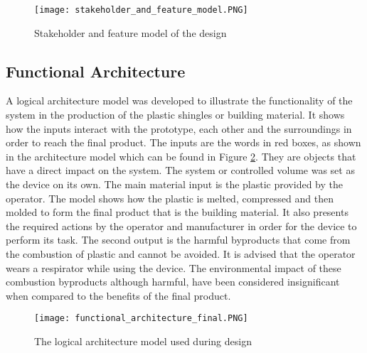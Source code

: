 \documentclass[11pt,english]{article}
\begin{document}
\begin{figure}[ht!]
\centering
\texttt{[image: stakeholder\_and\_feature\_model.PNG]}
\caption{Stakeholder and feature model of the design}
\label{fig:stakeholders}
\end{figure}

\newpage
\subsection{Functional Architecture}

A logical architecture model was developed to illustrate the functionality of the system in the production of the plastic shingles or building material. It shows how the inputs interact with the prototype, each other and the surroundings in order to reach the final product. The inputs are the words in red boxes, as shown in the architecture model which can be found in Figure \ref{fig:functional_architecture}. They are objects that have a direct impact on the system. The system or controlled volume was set as the device on its own. The main material input is the plastic provided by the operator. The model shows how the plastic is melted, compressed and then molded to form the final product that is the building material. It also presents the required actions by the operator and manufacturer in order for the device to perform its task. The second output is the harmful byproducts that come from the combustion of plastic and cannot be avoided. It is advised that the operator wears a respirator while using the device. The environmental impact of these combustion byproducts although harmful, have been considered insignificant when compared to the benefits of the final product.
\begin{figure}[ht!]
\centering
\texttt{[image: functional\_architecture\_final.PNG]}
\caption{The logical architecture model used during design}
\label{fig:functional_architecture}
\end{figure}
\newpage


\newpage
\end{document}
